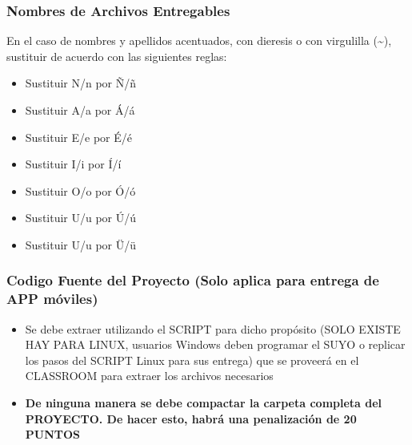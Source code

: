 \begin{frame}
\frametitle{Nombres de Archivos Entregables}
En el caso de nombres y apellidos acentuados, con dieresis o con virgulilla (\textasciitilde{}), sustituir de acuerdo con las siguientes reglas:
\begin{itemize}
\item Sustituir N/n por \~N/\~n
\item Sustituir A/a por \'A/\'a
\item Sustituir E/e por \'E/\'e
\item Sustituir I/i por \'I/\'i
\item Sustituir O/o por \'O/\'o
\item Sustituir U/u por \'U/\'u
\item Sustituir U/u por \"U/\"u
\end{itemize}
\end{frame}



\begin{frame}
\frametitle{Codigo Fuente del Proyecto (Solo aplica para entrega de APP m\'oviles)}
\begin{itemize}
\item Se debe extraer utilizando el SCRIPT para dicho prop\'osito (SOLO EXISTE HAY PARA LINUX, usuarios Windows deben programar el SUYO o replicar los pasos del SCRIPT Linux para sus entrega) que se proveerá en el CLASSROOM para extraer los archivos necesarios
\item \textbf{De ninguna manera se debe compactar la carpeta completa del PROYECTO. De hacer esto, habr\'a una penalizaci\'on de 20 PUNTOS}
\end{itemize}

\end{frame}
